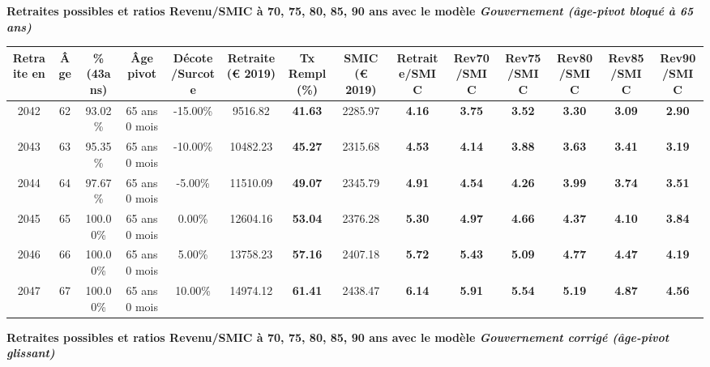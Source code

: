 {\bf \noindent Retraites possibles et ratios Revenu/SMIC à 70, 75, 80, 85, 90 ans avec le modèle \emph{Gouvernement (âge-pivot bloqué à 65 ans)}}  
 
\begin{adjustbox}{max width=\textwidth} 
\begin{tabular}[htb]{|c|c||c|c|c||c|c||c||c|c|c|c|c|c|} 
\hline 
 Retraite en &  Âge &  \%(43ans) &  Âge pivot &  Décote/Surcote &  Retraite (\euro{} 2019) &  Tx Rempl(\%) &  SMIC (\euro{} 2019) &  Retraite/SMIC &  Rev70/SMIC &  Rev75/SMIC &  Rev80/SMIC &  Rev85/SMIC &  Rev90/SMIC \\ 
\hline \hline 
 2042 &  62 &  93.02\% &  65 ans 0 mois &  -15.00\% &  9516.82 &  {\bf 41.63} &  2285.97 &  {\bf 4.16} &  {\bf 3.75} &  {\bf 3.52} &  {\bf 3.30} &  {\bf 3.09} &  {\bf 2.90} \\ 
\hline 
 2043 &  63 &  95.35\% &  65 ans 0 mois &  -10.00\% &  10482.23 &  {\bf 45.27} &  2315.68 &  {\bf 4.53} &  {\bf 4.14} &  {\bf 3.88} &  {\bf 3.63} &  {\bf 3.41} &  {\bf 3.19} \\ 
\hline 
 2044 &  64 &  97.67\% &  65 ans 0 mois &  -5.00\% &  11510.09 &  {\bf 49.07} &  2345.79 &  {\bf 4.91} &  {\bf 4.54} &  {\bf 4.26} &  {\bf 3.99} &  {\bf 3.74} &  {\bf 3.51} \\ 
\hline 
 2045 &  65 &  100.00\% &  65 ans 0 mois &  0.00\% &  12604.16 &  {\bf 53.04} &  2376.28 &  {\bf 5.30} &  {\bf 4.97} &  {\bf 4.66} &  {\bf 4.37} &  {\bf 4.10} &  {\bf 3.84} \\ 
\hline 
 2046 &  66 &  100.00\% &  65 ans 0 mois &  5.00\% &  13758.23 &  {\bf 57.16} &  2407.18 &  {\bf 5.72} &  {\bf 5.43} &  {\bf 5.09} &  {\bf 4.77} &  {\bf 4.47} &  {\bf 4.19} \\ 
\hline 
 2047 &  67 &  100.00\% &  65 ans 0 mois &  10.00\% &  14974.12 &  {\bf 61.41} &  2438.47 &  {\bf 6.14} &  {\bf 5.91} &  {\bf 5.54} &  {\bf 5.19} &  {\bf 4.87} &  {\bf 4.56} \\ 
\hline 
\hline 
\end{tabular} 
\end{adjustbox} 
 
 \vspace{0.1cm} 
{\bf \noindent Retraites possibles et ratios Revenu/SMIC à 70, 75, 80, 85, 90 ans avec le modèle \emph{Gouvernement corrigé (âge-pivot glissant)}}  
 
